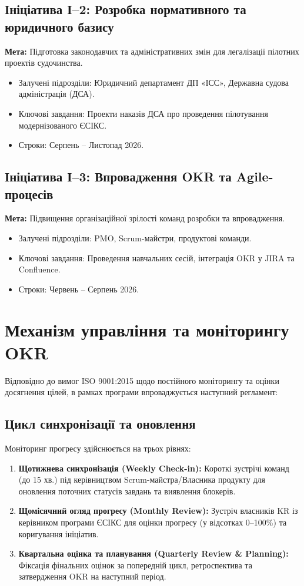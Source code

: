 \documentclass{article}
\begin{document}
\subsection{Ініціатива І--2: Розробка нормативного та юридичного базису}
\textbf{Мета:} Підготовка законодавчих та адміністративних змін для легалізації пілотних проектів судочинства.
\begin{itemize}
    \item Залучені підрозділи: Юридичний департамент ДП «ІСС», Державна судова адміністрація (ДСА).
    \item Ключові завдання: Проекти наказів ДСА про проведення пілотування модернізованого ЄСІКС.
    \item Строки: Серпень -- Листопад 2026.
\end{itemize}

\subsection{Ініціатива І--3: Впровадження OKR та Agile-процесів}
\textbf{Мета:} Підвищення організаційної зрілості команд розробки та впровадження.
\begin{itemize}
    \item Залучені підрозділи: PMO, Scrum-майстри, продуктові команди.
    \item Ключові завдання: Проведення навчальних сесій, інтеграція OKR у JIRA та Confluence.
    \item Строки: Червень -- Серпень 2026.
\end{itemize}

\newpage

\section{Механізм управління та моніторингу OKR}
Відповідно до вимог ISO 9001:2015 щодо постійного моніторингу та оцінки досягнення цілей, в рамках програми впроваджується наступний регламент:

\subsection{Цикл синхронізації та оновлення}
Моніторинг прогресу здійснюється на трьох рівнях:
\begin{enumerate}
    \item \textbf{Щотижнева синхронізація (Weekly Check-in):} Короткі зустрічі команд (до 15 хв.) під керівництвом Scrum-майстра/Власника продукту для оновлення поточних статусів завдань та виявлення блокерів.
    \item \textbf{Щомісячний огляд прогресу (Monthly Review):} Зустріч власників KR із керівником програми ЄСІКС для оцінки прогресу (у відсотках 0--100\%) та коригування ініціатив.
    \item \textbf{Квартальна оцінка та планування (Quarterly Review \& Planning):} Фіксація фінальних оцінок за попередній цикл, ретроспектива та затвердження OKR на наступний період.
\end{enumerate}
\end{document}
